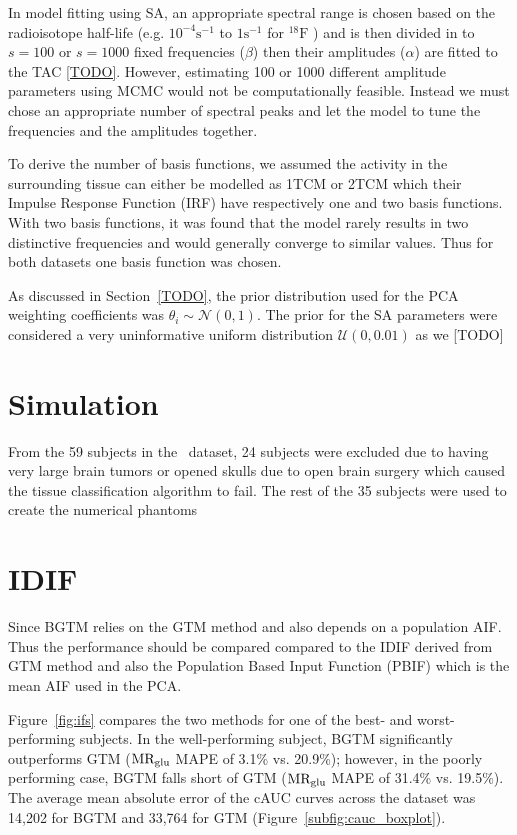 In model fitting using SA, an appropriate spectral range is chosen based on the radioisotope half-life (e.g. $10^{-4} \mathrm{s}^{-1}$ to $1 \mathrm{s}^{-1}$ for $^{18}\mathrm{F}$ ) and is then divided in to $s=100$ or $s=1000$ fixed frequencies ($\beta$) then their amplitudes ($\alpha$) are fitted to the TAC \ref{TODO}.
However, estimating 100 or 1000 different amplitude parameters using MCMC would not be computationally feasible.
Instead we must chose an appropriate number of spectral peaks and let the model to tune the frequencies and the amplitudes together.

To derive the number of basis functions, we assumed the activity in the surrounding tissue can either be modelled as 1TCM or 2TCM which their Impulse Response Function (IRF) have respectively one and two basis functions.
With two basis functions, it was found that the model rarely results in two distinctive frequencies and would generally converge to similar values.
Thus for both datasets one basis function was chosen.

As discussed in Section~\ref{TODO}, the prior distribution used for the PCA weighting coefficients was $\theta_i \sim \mathcal{N}(0,1)$.
The prior for the SA parameters were considered a very uninformative uniform distribution $\mathcal{U}(0,0.01)$ as we [TODO]


\section{Simulation}
From the 59 subjects in the \fdg $\,$ dataset, 24 subjects were excluded due to having very large brain tumors or opened skulls due to open brain surgery which caused the tissue classification algorithm to fail.
The rest of the 35 subjects were used to create the numerical phantoms




\section{IDIF}

Since BGTM relies on the GTM method and also depends on a population AIF. Thus the performance should be compared compared to the IDIF derived from GTM method and also the Population Based Input Function (PBIF) which is the mean AIF used in the PCA.


Figure~\ref{fig:ifs} compares the two methods for one of the best- and worst-performing subjects.
In the well-performing subject, BGTM significantly outperforms GTM ($\text{MR}_{\text{glu}}$ MAPE of 3.1\% vs. 20.9\%); however, in the poorly performing case, BGTM falls short of GTM ($\text{MR}_{\text{glu}}$ MAPE of 31.4\% vs. 19.5\%).
The average mean absolute error of the cAUC curves across the dataset was 14,202 for BGTM and 33,764 for GTM (Figure~\ref{subfig:cauc_boxplot}).

